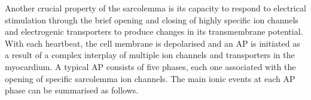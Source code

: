 
\vspace{0.2cm}
Another crucial property of the sarcolemma is its capacity to respond to electrical stimulation through the brief opening and closing of highly specific ion channels and electrogenic transporters to produce changes in its transmembrane potential. With each heartbeat, the cell membrane is depolarised and an AP is initiated as a result of a complex interplay of multiple ion channels and transporters in the myocardium. A typical AP consists of five phases, each one associated with the opening of specific sarcolemma ion channels. The main ionic events at each AP phase can be summarised as follows.

